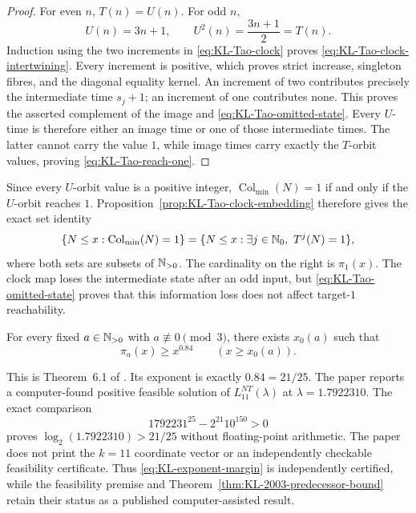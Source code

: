 \begin{proof}
For even \(n\), \(T(n)=U(n)\).  For odd \(n\),
\[
 U(n)=3n+1,\qquad U^2(n)=\frac{3n+1}{2}=T(n).
\]
Induction using the two increments in \eqref{eq:KL-Tao-clock} proves
\eqref{eq:KL-Tao-clock-intertwining}.  Every increment is positive, which
proves strict increase, singleton fibres, and the diagonal equality kernel.
An increment of two contributes precisely the intermediate time \(s_j+1\);
an increment of one contributes none.  This proves the asserted complement
of the image and \eqref{eq:KL-Tao-omitted-state}.  Every \(U\)-time is
therefore either an image time or one of those intermediate times.  The
latter cannot carry the value \(1\), while image times carry exactly the
\(T\)-orbit values, proving \eqref{eq:KL-Tao-reach-one}.
\end{proof}

Since every \(U\)-orbit value is a positive integer,
\(\operatorname{Col}_{\min}(N)=1\) if and only if the \(U\)-orbit reaches
\(1\).  Proposition~\ref{prop:KL-Tao-clock-embedding} therefore gives the
exact set identity
\begin{equation}
\label{eq:KL-Tao-count-identity}
 \{N\le x:\operatorname{Col}_{\min}(N)=1\}
 =
 \{N\le x:\exists j\in\mathbb{N}_{0},\ T^j(N)=1\},
\end{equation}
where both sets are subsets of \(\mathbb{N}_{>0}\).  The cardinality on the right is
\(\pi_1(x)\).  The clock map loses the intermediate state after an odd
input, but \eqref{eq:KL-Tao-omitted-state} proves that this information loss
does not affect target-\(1\) reachability.

\begin{theorem}
\label{thm:KL-2003-predecessor-bound}
For every fixed \(a\in\mathbb{N}_{>0}\) with \(a\not\equiv0\pmod3\), there exists
\(x_0(a)\) such that
\begin{equation}
\label{eq:KL-084}
 \pi_a(x)\ge x^{0.84}\qquad(x\ge x_0(a)).
\end{equation}
\end{theorem}

This is Theorem~6.1 of
\cite[p.~254]{KrasikovLagarias2003}.  Its exponent is exactly
\(0.84=21/25\).  The paper reports a computer-found positive feasible
solution of \(L_{11}^{NT}(\lambda)\) at
\(\lambda=1.7922310\).  The exact comparison
\begin{equation}
\label{eq:KL-exponent-margin}
 1792231^{25}-2^{21}10^{150}>0
\end{equation}
proves \(\log_2(1.7922310)>21/25\) without floating-point arithmetic.
The paper does not print the \(k=11\) coordinate vector or an independently
checkable feasibility certificate.  Thus
\eqref{eq:KL-exponent-margin} is independently certified, while the
feasibility premise and Theorem~\ref{thm:KL-2003-predecessor-bound} retain
their status as a published computer-assisted result.

